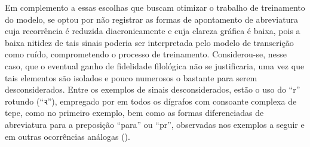 \documentclass[portuguese]{textolivre}
\begin{document}
Em complemento a essas escolhas que buscam otimizar o trabalho de treinamento do modelo, se optou por não registrar as formas de apontamento de abreviatura cuja recorrência é reduzida diacronicamente e cuja clareza gráfica é baixa, pois a baixa nitidez de tais sinais poderia ser interpretada pelo modelo de transcrição como ruído, comprometendo o processo de treinamento. Considerou-se, nesse caso, que o eventual ganho de fidelidade filológica não se justificaria, uma vez que tais elementos são isolados e pouco numerosos o bastante para serem desconsiderados. Entre os exemplos de sinais desconsiderados, estão o uso do “r” rotundo (“{\medievalfont ꝛ}”), empregado por \textcite{oliveira1536grammatica} em todos os dígrafos com consoante complexa de tepe, como no primeiro exemplo, bem como as formas diferenciadas de abreviatura para a preposição “para” ou “pr”, observadas nos exemplos a seguir e em outras ocorrências análogas ().
\end{document}
